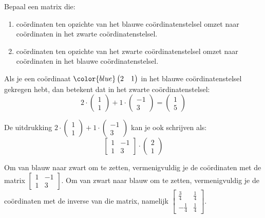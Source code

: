 \documentclass{ximera}
\begin{document}
\begin{exercise}
Bepaal een matrix die:
\begin{enumerate}
\item coördinaten ten opzichte van het blauwe coördinatenstelsel omzet naar coördinaten in het zwarte coördinatenstelsel.
\item coördinaten ten opzichte van het zwarte coördinatenstelsel omzet naar coördinaten in het blauwe coördinatenstelsel.
\end{enumerate}
\begin{hint}
Als je een coördinaat \(\color{blue}\begin{pmatrix} 2 & 1\end{pmatrix}\) in het blauwe coördinatenstelsel gekregen hebt, dan betekent dat in het zwarte coördinatenstelsel:
\[
2\cdot \begin{pmatrix} 1 \\ 1 \end{pmatrix} + 1 \cdot \begin{pmatrix} -1 \\ 3 \end{pmatrix} = \begin{pmatrix} 1 \\ 5 \end{pmatrix}
\]
\end{hint}
\begin{hint}
De uitdrukking \(2\cdot \begin{pmatrix} 1 \\ 1 \end{pmatrix} + 1 \cdot \begin{pmatrix} -1 \\ 3 \end{pmatrix}\) kan je ook schrijven als:
\[\begin{bmatrix} 1 & -1 \\ 1 & 3 \end{bmatrix} \cdot \begin{pmatrix} 2 \\ 1 \end{pmatrix}\]
\end{hint}
\begin{oplossing}
Om van blauw naar zwart om te zetten, vermenigvuldig je de coördinaten met de matrix \(\begin{bmatrix} 1 & -1 \\ 1 & 3 \end{bmatrix}\).\newline
Om van zwart naar blauw om te zetten, vermenigvuldig je de coördinaten met de inverse van die matrix, namelijk \(\begin{bmatrix} \frac{3}{4} & \frac{1}{4} \\ -\frac{1}{4} & \frac{1}{4} \end{bmatrix}\).
\end{oplossing}
\end{exercise}
\end{document}
